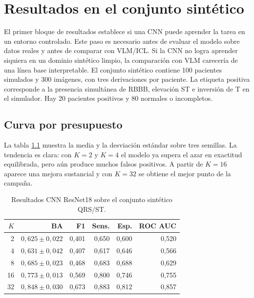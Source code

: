 \chapter{Resultados en el conjunto sintético}
\label{chap:resultados}

El primer bloque de resultados establece si una CNN puede aprender la tarea en un entorno controlado. Este paso es necesario antes de evaluar el modelo sobre datos reales y antes de comparar con VLM/ICL. Si la CNN no logra aprender siquiera en un dominio sintético limpio, la comparación con VLM carecería de una línea base interpretable. El conjunto sintético contiene 100 pacientes simulados y 300 imágenes, con tres derivaciones por paciente. La etiqueta positiva corresponde a la presencia simultánea de RBBB, elevación ST e inversión de T en el simulador. Hay 20 pacientes positivos y 80 normales o incompletos.

\section{Curva por presupuesto}

La tabla \ref{tab:resultados_sinteticos_finales} muestra la media y la desviación estándar sobre tres semillas. La tendencia es clara: con \(K=2\) y \(K=4\) el modelo ya supera el azar en exactitud equilibrada, pero aún produce muchos falsos positivos. A partir de \(K=16\) aparece una mejora sustancial y con \(K=32\) se obtiene el mejor punto de la campaña.

\begin{table}[H]
  \centering
  \small
  \begin{tabular}{rrrrrr}
    \toprule
    \(K\) & BA & F1 & Sens. & Esp. & ROC AUC \\
    \midrule
    2  & \(0,625 \pm 0,022\) & 0,401 & 0,650 & 0,600 & 0,520 \\
    4  & \(0,631 \pm 0,042\) & 0,407 & 0,617 & 0,646 & 0,566 \\
    8  & \(0,685 \pm 0,023\) & 0,468 & 0,683 & 0,688 & 0,629 \\
    16 & \(0,773 \pm 0,013\) & 0,569 & 0,800 & 0,746 & 0,755 \\
    32 & \(0,848 \pm 0,030\) & 0,673 & 0,883 & 0,812 & 0,857 \\
    \bottomrule
  \end{tabular}
  \caption{Resultados CNN ResNet18 sobre el conjunto sintético QRS/ST.}
  \label{tab:resultados_sinteticos_finales}
\end{table}

